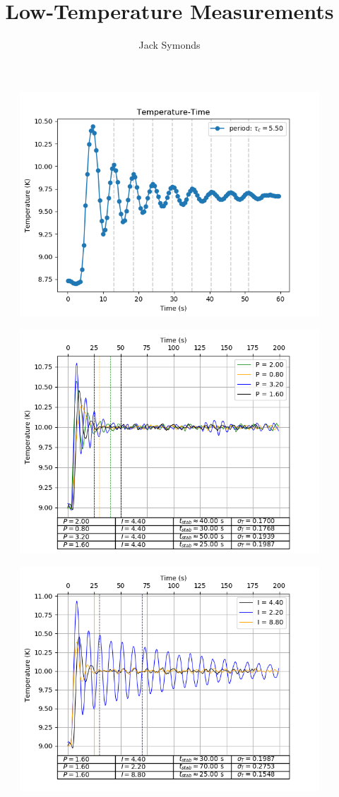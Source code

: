 \documentclass[8pt, a4paper]{article}
\title{Low-Temperature Measurements}
\author{Jack Symonds}
\date{}
\begin{document}
\begin{figure}[h!]
\includegraphics{tauc.png}
\end{figure}


\begin{figure}[h!]
\includegraphics{ptrace.png}
\end{figure}

\begin{figure}[h!]
\includegraphics{itrace.png}
\end{figure}
\end{document}
